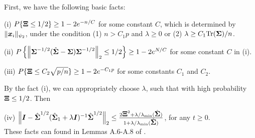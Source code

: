 \documentclass[12pt,a4paper]{article}%
\newcommand \vc[1]{{\mbox{\boldmath${#1}$}}}
\numberwithin{equation}{section}
\begin{document}
First, we have the following basic facts:

(i) $P\{\vc\Xi\leq 1/2\}\geq 1-2e^{-n/C}$ for some constant $C$, which is determined by $\|\vc x_i\|_{\psi_2}$, under the condition (1) $n>C_1p$ and $\lambda\geq0$ or (2) $\lambda\geq C_1\mathrm{Tr}(\vc\Sigma)/n$.

(ii) $P\left\{\left\|\vc\Sigma^{-1/2}(\hat{\vc\Sigma}-\vc\Sigma)\vc\Sigma^{-1/2}\right\|_2\leq 1/2\right\}\geq 1-2e^{N/C}$ for some constant $C$ in (i).

(iii) $P\{\vc\Xi\leq C_2\sqrt{p/n}\}\geq 1-2e^{-C_1p}$ for some constants $C_1$ and $C_2$.

By the fact (i), we can appropriately choose $\lambda$, such that with high probability $\vc\Xi\leq 1/2$. Then

(iv) $\left\|\vc I-\hat{\vc\Sigma}^{1/2}(\hat{\vc\Sigma}_1+\lambda \vc I)^{-1}\hat{\vc\Sigma}^{1/2}\right\|_2\leq \frac{2\vc\Xi^2+\lambda/\lambda_{\min}(\hat{\vc\Sigma})}{1+\lambda/\lambda_{\min}(\hat{\vc\Sigma})}$, for any $t\geq 0$.\\
These facts can found in Lemmas A.6-A.8 of \cite{FanGuoWang2019}.
\end{document}

